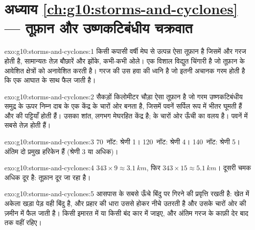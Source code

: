 \section*{अध्याय \ref{ch:g10:storms-and-cyclones} --- तूफ़ान और उष्णकटिबंधीय चक्रवात}

\begin{solution}{exo:g10:storms-and-cyclones:1}
 किसी कपासी वर्षी मेघ से उत्पन्न ऐसा तूफ़ान है जिसमें  और
गरज होती है, सामान्यतः तेज़ बौछारें और झोंके, कभी-कभी ओले।  एक विशाल
विद्युत चिंगारी है जो तूफ़ान के आवेशित क्षेत्रों को अनावेशित करती है। गरज
 की उस हवा की ध्वनि है जो इतनी अचानक गरम होती है कि एक आघात के साथ
फैल जाती है।
\end{solution}

\begin{solution}{exo:g10:storms-and-cyclones:2}
 सैकड़ों किलोमीटर चौड़ा ऐसा तूफ़ान है जो गरम उष्णकटिबंधीय
समुद्र के ऊपर निम्न दाब के एक केंद्र के चारों ओर बनता है, जिसमें पवनें सर्पिल रूप में भीतर घूमती हैं
और  की पट्टियाँ होती हैं।  उसका शांत, लगभग मेघरहित केंद्र है;
  के चारों ओर ऊँची  का वलय है। पवनें
 में सबसे तेज़ होती हैं।
\end{solution}

\begin{solution}{exo:g10:storms-and-cyclones:3}
\num{70}~नॉट: श्रेणी 1। \num{120}~नॉट: श्रेणी 4।
\num{140}~नॉट: श्रेणी 5। अंतिम दो प्रमुख हरिकेन हैं (श्रेणी 3
या अधिक)।
\end{solution}

\begin{solution}{exo:g10:storms-and-cyclones:4}
$343 \times 9 \approx \qty{3.1}{km}$, फिर $343 \times 15 \approx
\qty{5.1}{km}$। दूसरी चमक अधिक दूर है: तूफ़ान दूर जा रहा है।
\end{solution}

\begin{solution}{exo:g10:storms-and-cyclones:5}
 आसपास के सबसे ऊँचे बिंदु पर गिरने की प्रवृत्ति रखती है: खेत में अकेला खड़ा पेड़
वही बिंदु है, और प्रहार की धारा उससे होकर नीचे उतरती है और उसके चारों ओर की ज़मीन में
फैल जाती है। किसी इमारत में या किसी बंद कार में जाइए, और अंतिम गरज के काफ़ी देर
बाद तक वहीं रहिए।
\end{solution}

